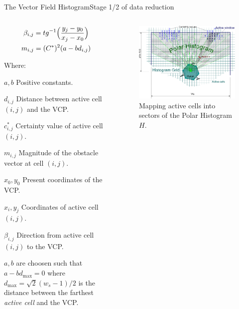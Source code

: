 \documentclass[8pt]{beamer}
\newcommand{\Ytri}{$\triangleright$ }
\renewcommand{\|}[1][.3em]{\hspace{#1}|\hspace{#1}}
\renewcommand{\,}[1][.3em]{,\hspace{#1}}
\newcommand{\subitem}[1]{{\setlength\itemindent{12pt}\item[\Ytri] #1}}
\begin{document}
\begin{frame}{The Vector Field Histogram}{Stage 1/2 of data reduction}
\begin{columns}
\begin{column}{0.5\textwidth}
\begin{itemize}
\item[] \begin{gather}
\beta_{i,j} = tg^{-1}\Big({y_j - y_0 \over x_j - x_0}\Big)\\
m_{i,j} = (C^*)^2(a-bd_{i,j}) 
\end{gather}
\item Where:{\footnotesize
    \subitem{$a,b$ Positive constants.}
    \subitem{$d_{i,j}$ Distance between active cell $(i,j)$ and the VCP.}
    \subitem{$c^*_{i,j}$ Certainty value of active cell $(i,j)$.}
    \subitem{$m_{i,j}$ Magnitude of the obstacle vector at cell $(i,j)$.}
    \subitem{$x_0, y_0$ Present coordinates of the VCP.}
    \subitem{$x_i, y_j$ Coordinates of active cell $(i,j)$.}
    \subitem{$\beta_{i,j}$ Direction from active cell $(i,j)$ to the VCP.}
\item $a,b$ are choosen such that $a - bd_{\max} = 0$ where $d_{\max} = \sqrt{2}(w_s - 1)/2$ is the distance between the farthest \emph{active cell} and the VCP.}
\end{itemize}
\end{column}
\begin{column}{0.5\textwidth}
    \begin{figure}\centering
        \includegraphics[width=1\textwidth]{vfh_C}
        \caption{Mapping active cells into sectors of the Polar Histogram $H$.}
     \end{figure}
\end{column}\end{columns}
\end{frame}
\end{document}
